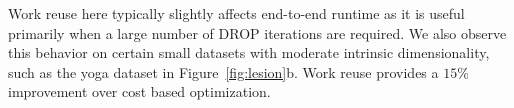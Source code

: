 Work reuse here typically slightly affects end-to-end runtime as it is useful primarily when a large number of DROP iterations are required.
We also observe this behavior on certain small datasets with moderate intrinsic dimensionality, such as the yoga dataset in Figure~\ref{fig:lesion}b. 
Work reuse provides a $15\%$ improvement over cost based optimization.

